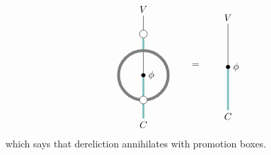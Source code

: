\documentclass[english,letter paper,12pt,reqno]{article}
\def\drawbang{\draw[color=teal!50, line width=2pt]}
\def\drawprom{\draw[color=gray, line width=3pt]}
\def\mapnode{\node[circle,draw=black,fill=black,inner sep=0.5mm]}
\def\dernode{\node[circle,draw=black,fill=white]}
\theoremstyle{example}
\numberwithin{equation}{section}
\begin{document}
\begin{equation}\label{eq:prom_cancel_der}
\begin{tikzpicture}[scale=0.6,auto,inner sep=1mm,baseline=(current  bounding  box.center)]
\node (top) at (0,4) {$V$};
\dernode (altop) at (0,2.5) {};
\node (bottom) at (0,-3) {$C$};
\mapnode (o) at (0,0) {};
\node [right] at (o.east) {$\phi$};
\draw (o) to (0,2);
\drawbang (bottom) -- (0,-1.5);
\drawbang (0,1.5) -- (altop);
\draw (altop) -- (top);
\drawbang (0,-1.5) -- (o);
\drawprom (0,0) ellipse (1.5cm and 1.5cm);
\dernode (bottom) at (0,-1.5) {};
\end{tikzpicture}
\qquad = \qquad
\begin{tikzpicture}[scale=0.6,auto,inner sep=1mm,baseline=(current  bounding  box.center)]
\node (top) at (0,3) {$V$};
\node (bottom) at (0,-3) {$C$};
\mapnode (o) at (0,0) {};
\node [right] at (o.east) {$\phi$};
\drawbang (bottom) -- (o);
\draw (o) -- (top);
\end{tikzpicture}
\end{equation}
which says that dereliction annihilates with promotion boxes.
\end{document}
